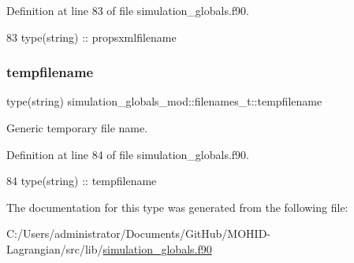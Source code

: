 Definition at line 83 of file simulation\+\_\+globals.\+f90.


\begin{DoxyCode}
83         \textcolor{keywordtype}{type}(string) :: propsxmlfilename
\end{DoxyCode}
\mbox{\label{structsimulation__globals__mod_1_1filenames__t_a207bede622cac14f7baef87cf0c000b7}} 
\subsubsection{\texorpdfstring{tempfilename}{tempfilename}}
{\footnotesize\ttfamily type(string) simulation\+\_\+globals\+\_\+mod\+::filenames\+\_\+t\+::tempfilename\hspace{0.3cm}{\ttfamily [private]}}



Generic temporary file name. 



Definition at line 84 of file simulation\+\_\+globals.\+f90.


\begin{DoxyCode}
84         \textcolor{keywordtype}{type}(string) :: tempfilename
\end{DoxyCode}


The documentation for this type was generated from the following file\+:\begin{DoxyCompactItemize}
\item 
C\+:/\+Users/administrator/\+Documents/\+Git\+Hub/\+M\+O\+H\+I\+D-\/\+Lagrangian/src/lib/\mbox{\hyperlink{simulation__globals_8f90}{simulation\+\_\+globals.\+f90}}\end{DoxyCompactItemize}
